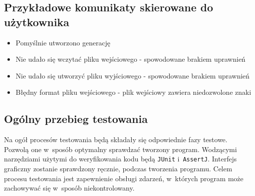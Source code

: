 \documentclass[a4paper,11pt]{article}
\begin{document}
		  \subsection{Przykładowe komunikaty skierowane do użytkownika}
				    \begin{itemize}
				      \item Pomyślnie utworzono generację
				      \item Nie udało się wczytać pliku wejściowego - spowodowane brakiem uprawnień
				      \item Nie udało się utworzyć pliku wyjściowego - spowodowane brakiem uprawnień
				      \item Błędny format pliku wejściowego - plik wejściowy zawiera niedozwolone znaki
				    \end{itemize}
			\subsection{Ogólny przebieg testowania}
	Na ogół procesów testowania będą składały  się odpowiednie fazy testowe. Pozwolą one w~sposób optymalny sprawdzać tworzony program. Wodzącymi narzędziami użytymi do weryfikowania kodu będą \texttt{JUnit} i~\texttt{AssertJ}. Interfejs graficzny zostanie sprawdzony ręcznie, podczas tworzenia programu. Celem procesu testowania jest zapewnienie obsługi zdarzeń, w~których program może zachowywać się w~sposób niekontrolowany.
\end{document}

